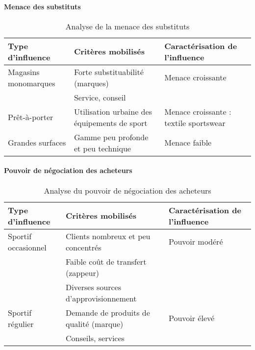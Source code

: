     \paragraph{Menace des substituts}
    
    \begin{table}[!ht]
      \begin{center}
	\begin{tabular}{p{4cm}|p{5cm}|p{6cm}}
	  Type d'influence & Critères mobilisés & Caractérisation de l'influence \\ \hline
	  Magasins monomarques & Forte substituabilité (marques) & Menace croissante \\
	  & Service, conseil & \\ \hline
	  Prêt-à-porter & Utilisation urbaine des équipements de sport & Menace croissante : textile sportswear \\ \hline
	  Grandes surfaces & Gamme peu profonde et peu technique & Menace faible \\
	\end{tabular}
	\caption{Analyse de la menace des substituts}
      \end{center}
    \end{table} 
    
    \paragraph{Pouvoir de négociation des acheteurs}
    
    \begin{table}[!ht]
      \begin{center}
	\begin{tabular}{p{4cm}|p{6cm}|p{5cm}}
	  Type d'influence & Critères mobilisés & Caractérisation de l'influence \\ \hline
	  Sportif occasionnel & Clients nombreux et peu concentrés & Pouvoir modéré \\
	  & Faible coût de transfert (zappeur) & \\
	  & Diverses sources d'approvisionnement & \\ \hline
	  Sportif régulier & Demande de produits de qualité (marque) & Pouvoir élevé \\
	  & Conseils, services & \\
	\end{tabular}
	\caption{Analyse du pouvoir de négociation des acheteurs}
      \end{center}
    \end{table}
    
